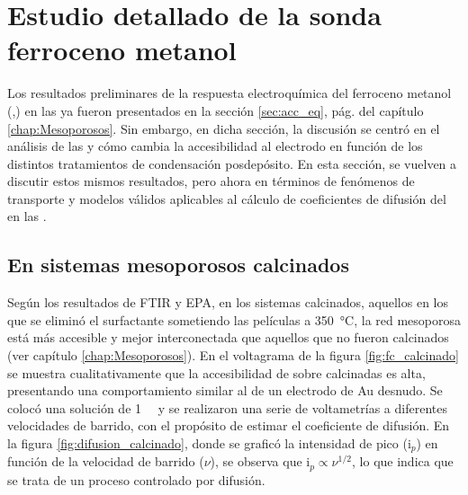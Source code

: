 \section{Estudio detallado de la sonda ferroceno metanol}\label{sec:difusion}

	 Los resultados preliminares de la respuesta electroquímica del ferroceno metanol (\ferroceno,\fc) en las \pdmF\space ya fueron presentados en la sección \ref{sec:acc_eq}, pág. \pageref{sec:acc_eq} del capítulo \ref{chap:Mesoporosos}. Sin embargo, en dicha sección, la discusión se centró en el análisis de las \pdm\space y cómo cambia la accesibilidad al electrodo en función de los distintos tratamientos de condensación posdepósito.
	 En esta sección, se vuelven a discutir estos mismos resultados, pero ahora en términos de fenómenos de transporte y modelos válidos aplicables al cálculo de coeficientes de difusión del \fc\space en las \pdm.

	\subsection{En sistemas mesoporosos calcinados}

	 Según los resultados de FTIR y EPA, en los sistemas calcinados, aquellos en los que se eliminó el surfactante sometiendo las películas a \SI{350}{\celsius}, la red mesoporosa está más accesible y mejor interconectada que aquellos que no fueron calcinados (ver capítulo \ref{chap:Mesoporosos}). En el voltagrama de la figura \ref{fig:fc_calcinado} se muestra cualitativamente que la accesibilidad de \fc\space sobre \pdmF\space calcinadas es alta, presentando una comportamiento similar al de un electrodo de Au desnudo. Se colocó una solución de \fc\space \SI{1}{\milli\Molar} y se realizaron una serie de voltametrías a diferentes velocidades de barrido, con el propósito de estimar el coeficiente de difusión. En la figura \ref{fig:difusion_calcinado}, donde se graficó la intensidad de pico (i$_p$) en función de la velocidad de barrido ($\nu$), se observa que $\text{i}_p \propto \nu^{1/2}$, lo que indica que se trata de un proceso controlado por difusión. 

